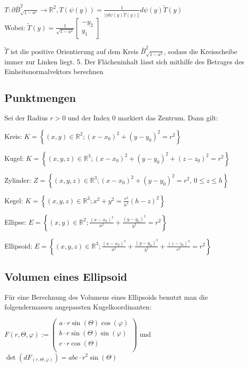\documentclass[a4paper, fontsize = 8pt, landscape]{scrartcl}
\newcommand{\R}[0]{\mathbb{R}}
\begin{document}
\begin{multicols*}{3}
\begin{center}
        $T: \partial \bar{B}^2_{\sqrt{1-a^2}} \rightarrow \R^2, T(\psi(y)) = \frac{1}{||d\psi(y)\tilde{T}(y)||}d\psi(y)\tilde{T}(y)$ \\
        Wobei: $\tilde{T}(y) = \frac{1}{\sqrt{1-a^2}} \begin{bmatrix}
                -y_2 \\ y_1
            \end{bmatrix}$
    \end{center}
    $\tilde{T}$ ist die positive Orientierung auf dem Kreis $\bar{B}^2_{\sqrt{1-a^2}}$, sodass die Kreisscheibe immer zur Linken liegt.
    5. Der Flächeninhalt lässt sich mithilfe des Betrages des Einheitsnormalvektors berechnen \\

    \begin{small}
        \subsection{Punktmengen}

        Sei der Radius $r > 0$ und der Index 0 markiert das Zentrum. Dann gilt: \medskip

        Kreis: $K = \left\{(x, y)\in \mathbb{R}^2; (x-x_0)^2+(y-y_0)^2 = r^2 \right\}$ \medskip

        Kugel: $K = \left\{(x, y, z)\in \mathbb{R}^3; (x-x_0)^2+(y-y_0)^2+(z-z_0)^2 = r^2 \right\}$ \medskip

        Zylinder: $Z=\left\{(x, y, z)\in \mathbb{R}^3; (x-x_0)^2+(y-y_0)^2 =r^2, \, 0\le z \le h \right\}$ \medskip

        Kegel: $K=\left\{(x, y, z)\in \mathbb{R}^3; x^2+y^2 = \frac{r^2}{h^2}(h-z)^2 \right\}$ \medskip

        Ellipse: $E=\left\{(x, y)\in \mathbb{R}^2; \frac{(x-x_0)^2}{a^2}+\frac{(y-y_0)^2 }{b^2} = r^2 \right\}$ \medskip

        Ellipsoid: $E=\left\{(x, y, z)\in \mathbb{R}^3; \frac{(x-x_0)^2}{a^2}+\frac{(y-y_0)^2}{b^2} +\frac{(z-z_0)^2}{c^2} = r^2 \right\}$

        \subsection{Volumen eines Ellipsoid}

        Für eine Berechnung des Volumens eines Ellipsoids benutzt man die folgendermassen angepassten Kugelkoordinanten:

        \begin{center}
            $F(r, \Theta, \varphi) := \begin{pmatrix}
                    a \cdot r \sin(\Theta) \cos(\varphi) \\ b \cdot r \sin(\Theta) \sin(\varphi) \\ c \cdot r \cos(\Theta) \\
                \end{pmatrix}$ und $\det(dF_{(r, \Theta, \varphi)}) = abc \cdot r^2 \sin(\Theta)$
        \end{center}


\end{small}
\end{multicols*}
\end{document}

